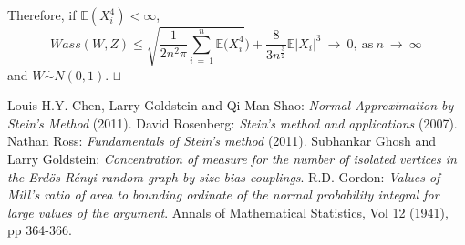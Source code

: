 \documentclass[12pt]{article}
\newcommand\qed{\hfill\hbox{\rlap{$\sqcap$}$\sqcup$}}
\newcommand{\eq }{\: = \:}
\theoremstyle{nonumberplain}
\begin{document}
Therefore, if $\mathbb{E}(X_{i}^{4})<\infty$,
$$
Wass(W,Z)\leq \sqrt{\frac{1}{2n^{2}\pi} \sum_{i\eq 1}^{n} \mathbb{E}(X_{i}^{4}})+\frac{8}{3n^{\frac{3}{2}}} \mathbb{E}|X_{i}|^{3} \ \rightarrow \ 0,\ \mbox{as}\ n\ \rightarrow \ \infty\, 
$$
and $W \overset{\cdot}{\sim} N(0,1)$.
\qed 


\newpage


\begin{thebibliography}{99}

 Louis H.Y. Chen, Larry Goldstein and Qi-Man Shao: {\em Normal Approximation by Stein's Method } (2011).
 David Rosenberg: {\em Stein’s method and applications } (2007).
 Nathan Ross: {\em Fundamentals of Stein’s method } (2011).
 Subhankar Ghosh and Larry Goldstein: {\em Concentration of measure for the number of isolated vertices in the
Erd\"os-R\'enyi random graph by size bias couplings}.
 R.D. Gordon: {\em Values of Mill's ratio of area to bounding ordinate of the normal probability integral for large values of the argument}. Annals of Mathematical Statistics, Vol 12 (1941), pp 364-366.
\end{thebibliography}
\end{document}
